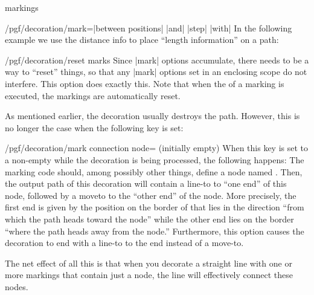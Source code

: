 \begin{decoration}{markings}
\begin{key}{/pgf/decoration/mark=|between positions|
       |and|  |step| 
      |with| }
    In the following example we use the distance info to place
    ``length information'' on a path:
\begin{codeexample}[]
\end{codeexample}
  \end{key}

  \begin{key}{/pgf/decoration/reset marks}
    Since |mark| options accumulate, there needs to be a way to
    ``reset'' things, so that any |mark| options set in an enclosing
    scope do not interfere. This option does exactly this. Note that
    when the  of a marking is executed, the markings are
    automatically reset.
  \end{key}

  As mentioned earlier, the decoration usually destroys the
  path. However, this is no longer the case when the following key is
  set:
  \begin{key}{/pgf/decoration/mark connection node= (initially empty)}
    When this key is set to a non-empty  while the
    decoration is being processed, the following happens: The marking
    code should, among possibly other things, define a node named
    . Then, the output path of this decoration will
    contain a line-to to ``one end'' of this node, followed by a
    moveto to the ``other end'' of the node. More precisely, the first
    end is given by the position on the border of 
    that lies in the direction ``from which the path heads toward the
    node'' while the other end lies on the border ``where the path
    heads away from the node.'' Furthermore, this option causes the
    decoration to end with a line-to to the end instead of a move-to.

    The net effect of all this is that when you decorate a straight
    line with one or more markings that contain just a node, the line
    will effectively connect these nodes.


\end{key}
\end{decoration}
